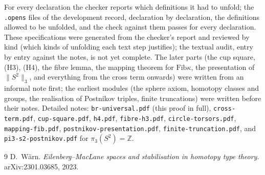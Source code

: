 \documentclass[11pt]{amsart}
\theoremstyle{definition}
\theoremstyle{remark}
\newcommand{\Z}{\mathbb{Z}}
\newcommand{\code}[1]{\texttt{#1}}
\newcommand{\Fib}{\mathrm{Fib}}
\newcommand{\tr}[1]{\|#1\|}
\begin{document}
\smallskip
For every declaration the checker reports which definitions it had to unfold; the
\code{.opens} files of the development record, declaration by declaration, the
definitions allowed to be unfolded, and the check against them passes for every
declaration. These specifications were generated from the checker's report and reviewed
by kind (which kinds of unfolding each text step justifies); the textual audit, entry by
entry against the notes, is not yet complete. The later parts (the cup square, (H3),
(H4), the fibre lemma, the mapping theorem for $\Fib\kappa$, the presentation of
$\tr{S^2}_3$, and everything from the cross term onwards) were written from an
informal note first; the earliest modules (the sphere axiom, homotopy classes and
groups, the realisation of Postnikov triples, finite truncations) were written before
their notes. Detailed notes:
\code{br-universal.pdf} (this proof in full), \code{cross-term.pdf},
\code{cup-square.pdf}, \code{h4.pdf}, \code{fibre-h3.pdf}, \code{circle-torsors.pdf},
\code{mapping-fib.pdf}, \code{postnikov-presentation.pdf}, \code{finite-truncation.pdf},
and \code{pi3-s2-postnikov.pdf} for $\pi_3(S^2)=\Z$.

\begin{thebibliography}{9}
 D.~W\"arn. \emph{Eilenberg--MacLane spaces and stabilisation in homotopy
  type theory}. arXiv:2301.03685, 2023.
\end{thebibliography}
\end{document}
